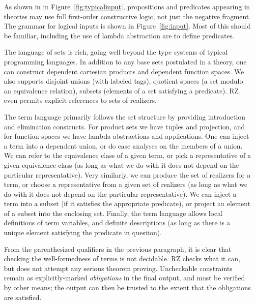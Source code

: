
As shown in in Figure~\ref{fig:typicalinput}, propositions and predicates
appearing in theories may use full first-order constructive logic, not just the
negative fragment. The grammar for logical inputs is shown in
Figure~\ref{fig:input}. Most of this should be familiar, including the use of
lambda abstraction are to define predicates.

The language of sets is rich, going well beyond the type systems of typical
programming languages. In addition to any base sets postulated in a theory, one
can construct dependent cartesian products and dependent function spaces. We
also supports disjoint unions (with labeled tags), quotient spaces (a set
modulo an equivalence relation), subsets (elements of a set satisfying a
predicate). RZ even permits explicit references to sets of realizers.

The term language primarily follows the set structure by providing
introduction and elimination constructs. For product sets we have tuples and
projection, and for function spaces we have lambda abstractions and
applications. One can inject a term into a dependent union, or do case analyses
on the members of a union. We can refer to the equivalence class of a given
term, or pick a representative of a given equivalence class (as long as what we
do with it does not depend on the particular representative). Very similarly,
we can produce the set of realizers for a term, or choose a representative from
a given set of realizers (as long as what we do with it does not depend on the
particular representative). We can inject a term into a subset (if it satisfies
the appropriate predicate), or project an element of a subset into the
enclosing set. Finally, the term language allows local definitions of term
variables, and definite descriptions (as long as there is a unique element
satisfying the predicate in question).

From the parenthesized qualifiers in the previous paragraph, it is clear that checking the
well-formedness of terms is not decidable. RZ checks what it can, but does not
attempt any serious theorem proving.  Uncheckable constraints remain as
explicitly-marked \emph{obligations} in the final output, and must be verified
by other means; the output can then be trusted to the extent that the obligations are satisfied.





